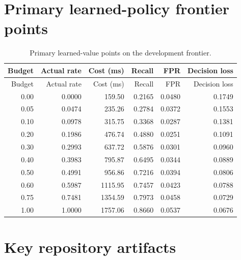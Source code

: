 \documentclass[11pt,a4paper]{article}
\begin{document}
\section{Primary learned-policy frontier points}

\begin{longtable}{@{}rrrrrr@{}}
\caption{Primary learned-value points on the development frontier.}\label{tab:allfrontier}\\
\toprule
Budget & Actual rate & Cost (ms) & Recall & FPR & Decision loss \\
\midrule
\endfirsthead
\toprule
Budget & Actual rate & Cost (ms) & Recall & FPR & Decision loss \\
\midrule
\endhead
0.00 & 0.0000 & 159.50 & 0.2165 & 0.0480 & 0.1749 \\
0.05 & 0.0474 & 235.26 & 0.2784 & 0.0372 & 0.1553 \\
0.10 & 0.0978 & 315.75 & 0.3368 & 0.0287 & 0.1381 \\
0.20 & 0.1986 & 476.74 & 0.4880 & 0.0251 & 0.1091 \\
0.30 & 0.2993 & 637.72 & 0.5876 & 0.0301 & 0.0960 \\
0.40 & 0.3983 & 795.87 & 0.6495 & 0.0344 & 0.0889 \\
0.50 & 0.4991 & 956.86 & 0.7216 & 0.0394 & 0.0806 \\
0.60 & 0.5987 & 1115.95 & 0.7457 & 0.0423 & 0.0788 \\
0.75 & 0.7481 & 1354.59 & 0.7973 & 0.0458 & 0.0729 \\
1.00 & 1.0000 & 1757.06 & 0.8660 & 0.0537 & 0.0676 \\
\bottomrule
\end{longtable}

\section{Key repository artifacts}
\end{document}
